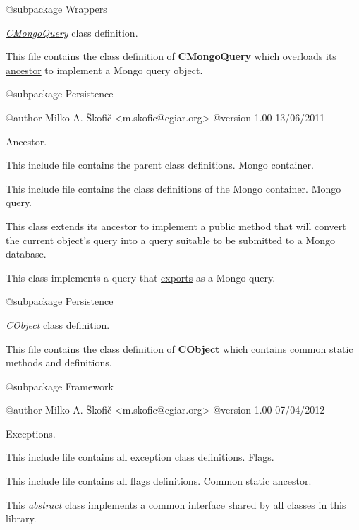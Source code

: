 \begin{DoxyVerb}    @subpackage     Wrappers\end{DoxyVerb}


{\itshape \hyperlink{class_c_mongo_query}{C\-Mongo\-Query}} class definition.

This file contains the class definition of {\bfseries \hyperlink{class_c_mongo_query}{C\-Mongo\-Query}} which overloads its \hyperlink{class_c_query}{ancestor} to implement a Mongo query object.

\begin{DoxyVerb}    @subpackage     Persistence

    @author         Milko A. Škofič <m.skofic@cgiar.org>
    @version        1.00 13/06/2011\end{DoxyVerb}


Ancestor.

This include file contains the parent class definitions. Mongo container.

This include file contains the class definitions of the Mongo container. Mongo query.

This class extends its \hyperlink{class_c_query}{ancestor} to implement a public method that will convert the current object's query into a query suitable to be submitted to a Mongo database.

This class implements a query that \hyperlink{}{exports} as a Mongo query.

\begin{DoxyVerb}    @subpackage     Persistence\end{DoxyVerb}


{\itshape \hyperlink{class_c_object}{C\-Object}} class definition.

This file contains the class definition of {\bfseries \hyperlink{class_c_object}{C\-Object}} which contains common static methods and definitions.

\begin{DoxyVerb}    @subpackage     Framework

    @author         Milko A. Škofič <m.skofic@cgiar.org>
    @version        1.00 07/04/2012\end{DoxyVerb}


Exceptions.

This include file contains all exception class definitions. Flags.

This include file contains all flags definitions. Common static ancestor.

This {\itshape abstract} class implements a common interface shared by all classes in this library.

